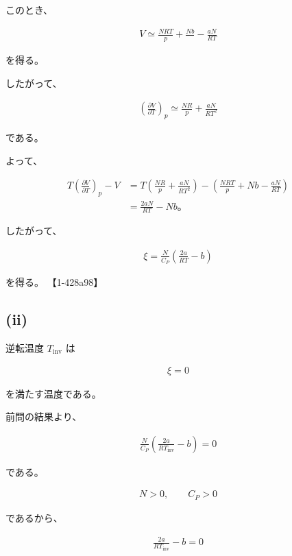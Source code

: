 \documentclass[platex,dvipdfmx,a4paper]{jsarticle}
\begin{document}
このとき、

\begin{align*}
V
\simeq
\frac{NRT}{p}
+
\frac{Nb}{}
-\frac{aN}{RT}
\end{align*}

を得る。

したがって、

\begin{align*}
\left(
\frac{\partial V}{\partial T}
\right)_p
\simeq
\frac{NR}{p}
+
\frac{aN}{RT^2}
\end{align*}

である。

よって、

\begin{align*}
T
\left(
\frac{\partial V}{\partial T}
\right)_p
-V
&=
T
\left(
\frac{NR}{p}
+
\frac{aN}{RT^2}
\right)
-
\left(
\frac{NRT}{p}
+
Nb
-
\frac{aN}{RT}
\right)
\\
&=
\frac{2aN}{RT}
-Nb。
\end{align*}

したがって、

\begin{align*}
\boxed{
\xi
=
\frac{N}{C_P}
\left(
\frac{2a}{RT}
-b
\right)
}
\end{align*}

を得る。 【1-428a98】

\subsection{(ii)}

逆転温度 $T_{\mathrm{inv}}$ は

\begin{align*}
\xi=0
\end{align*}

を満たす温度である。

前問の結果より、

\begin{align*}
\frac{N}{C_P}
\left(
\frac{2a}{RT_{\mathrm{inv}}}
-b
\right)
=
0
\end{align*}

である。

\begin{align*}
N>0,
\qquad
C_P>0
\end{align*}

であるから、

\begin{align*}
\frac{2a}{RT_{\mathrm{inv}}}
-b
=
0
\end{align*}
\end{document}
